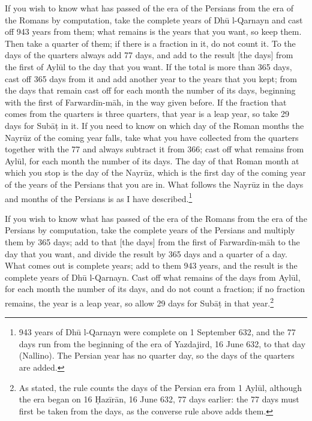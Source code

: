 \documentclass[11pt]{article}
\newcommand{\ArPage}[1]{\marginpar{\footnotesize\color{gray}Ar.\,p.\,#1}}
\begin{document}
\par \ArPage{105}If you wish to know what has passed of the era of the Persians from the era of the Romans by computation, take the complete years of Dhū l-Qarnayn and cast off 943 years from them; what remains is the years that you want, so keep them. Then take a quarter of them; if there is a fraction in it, do not count it. To the days of the quarters always add 77 days, and add to the result [the days] from the first of Aylūl to the day that you want. If the total is more than 365 days, cast off 365 days from it and add another year to the years that you kept; from the days that remain cast off for each month the number of its days, beginning with the first of Farwardīn-māh, in the way given before. If the fraction that comes from the quarters is three quarters, that year is a leap year, so take 29 days for Subāṭ in it. If you need to know on which day of the Roman months the Nayrūz of the coming year falls, take what you have collected from the quarters together with the 77 and always subtract it from 366; cast off what remains from Aylūl, for each month the number of its days. The day of that Roman month at which you stop is the day of the Nayrūz, which is the first day of the coming year of the years of the Persians that you are in. What follows the Nayrūz in the days and months of the Persians is as I have described.\footnote{943 years of Dhū l-Qarnayn were complete on 1 September 632, and the 77 days run from the beginning of the era of Yazdajird, 16 June 632, to that day (Nallino). The Persian year has no quarter day, so the days of the quarters are added.}\par
\par If you wish to know what has passed of the era of the Romans from the era of the Persians by computation, take the complete years of the Persians and multiply them by 365 days; add to that [the days] from the first of Farwardīn-māh to the day that you want, and divide the result by 365 days and a quarter of a day. What comes out is complete years; add to them 943 years, and the result is the complete years of Dhū l-Qarnayn. Cast off what remains of the days from Aylūl, for each month the number of its days, and do not count a fraction; if no fraction remains, the year is a leap year, so allow 29 days for Subāṭ in that year.\footnote{As stated, the rule counts the days of the Persian era from 1 Aylūl, although the era began on 16 Ḥazīrān, 16 June 632, 77 days earlier: the 77 days must first be taken from the days, as the converse rule above adds them.}\par
\end{document}
